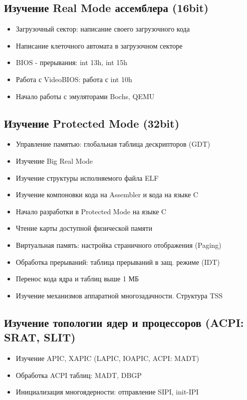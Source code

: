 \documentclass[a4paper,11pt]{extarticle}
\begin{document}
	\subsection{Изучение Real Mode ассемблера (16bit)}
	\begin{itemize}
		\item Загрузочный сектор: написание своего загрузочного кода
		\item Написание клеточного автомата в загрузочном секторе
		\item BIOS - прерывания: int 13h, int 15h
		\item Работа с VideoBIOS: работа с int 10h
		\item Начало работы с эмуляторами Bochs, QEMU
	\end{itemize}
	\subsection{Изучение Protected Mode (32bit)}
	\begin{itemize}
		\item Управление памятью: глобальная таблица дескрипторов (GDT)
		\item Изучение Big Real Mode
		\item Изучение структуры исполняемого файла ELF
		\item Изучение компоновки кода на Assembler и кода на языке C
		\item Начало разработки в Protected Mode на языке C
		\item Чтение карты доступной физической памяти
		\item Виртуальная память: настройка страничного отображения (Paging)
		\item Обработка прерываний: таблица прерываний в защ. режиме (IDT)
		\item Перенос кода ядра и таблиц выше 1 МБ
		\item Изучение механизмов аппаратной многозадачности. Структура TSS
	\end{itemize}
	\subsection{Изучение топологии ядер и процессоров (ACPI: SRAT, SLIT)}
	\begin{itemize}
		\item Изучение APIC, XAPIC (LAPIC, IOAPIC, ACPI: MADT)
		\item Обработка ACPI таблиц: MADT, DBGP
		\item Инициализация многоядерности: отправление SIPI, init-IPI
	\end{itemize}
\end{document}
